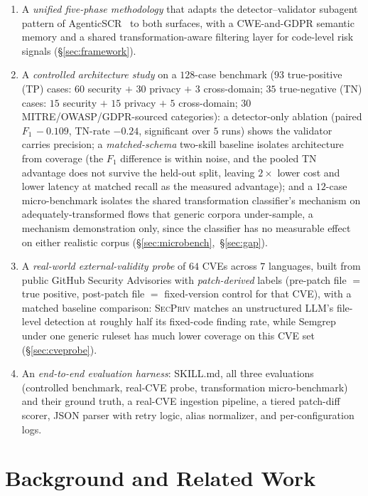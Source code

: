 \documentclass[runningheads]{llncs}
\begin{document}
\begin{enumerate}
\item A \emph{unified five-phase methodology} that adapts the detector--validator subagent pattern of AgenticSCR~\cite{charoenwet2026agenticscr} to both surfaces, with a CWE-and-GDPR semantic memory and a shared transformation-aware filtering layer for code-level risk signals (\S\ref{sec:framework}).
\item A \emph{controlled architecture study} on a $128$-case benchmark ($93$ true-positive (TP) cases: $60$ security $+$ $30$ privacy $+$ $3$ cross-domain; $35$ true-negative (TN) cases: $15$ security $+$ $15$ privacy $+$ $5$ cross-domain; $30$ MITRE/OWASP/GDPR-sourced categories): a detector-only ablation (paired $F_1\,-0.109$, TN-rate $-0.24$, significant over $5$ runs) shows the validator carries precision; a \emph{matched-schema} two-skill baseline isolates architecture from coverage (the $F_1$ difference is within noise, and the pooled TN advantage does not survive the held-out split, leaving $2\times$ lower cost and lower latency at matched recall as the measured advantage); and a $12$-case micro-benchmark isolates the shared transformation classifier's mechanism on adequately-transformed flows that generic corpora under-sample, a mechanism demonstration only, since the classifier has no measurable effect on either realistic corpus (\S\ref{sec:microbench},~\S\ref{sec:gap}).
\item A \emph{real-world external-validity probe} of $64$ CVEs across $7$ languages, built from public GitHub Security Advisories with \emph{patch-derived} labels (pre-patch file $=$ true positive, post-patch file $=$ fixed-version control for that CVE), with a matched baseline comparison: \textsc{SecPriv} matches an unstructured LLM's file-level detection at roughly half its fixed-code finding rate, while Semgrep under one generic ruleset has much lower coverage on this CVE set (\S\ref{sec:cveprobe}).
\item An \emph{end-to-end evaluation harness}: SKILL.md, all three evaluations (controlled benchmark, real-CVE probe, transformation micro-benchmark) and their ground truth, a real-CVE ingestion pipeline, a tiered patch-diff scorer, JSON parser with retry logic, alias normalizer, and per-configuration logs.
\end{enumerate}

\section{Background and Related Work}\label{sec:related}
\end{document}
